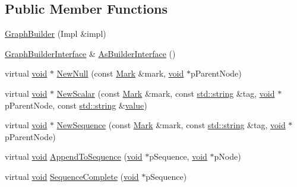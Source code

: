 \subsection*{Public Member Functions}
\begin{DoxyCompactItemize}
\item 
\mbox{\hyperlink{class_y_a_m_l_1_1_graph_builder_ae7f73588ad09321c10c09dff742bcc62}{Graph\+Builder}} (Impl \&impl)
\item 
\mbox{\hyperlink{class_y_a_m_l_1_1_graph_builder_interface}{Graph\+Builder\+Interface}} \& \mbox{\hyperlink{class_y_a_m_l_1_1_graph_builder_a11986f0addaf16cc02c637d16a039f78}{As\+Builder\+Interface}} ()
\item 
virtual \mbox{\hyperlink{glad_8h_a950fc91edb4504f62f1c577bf4727c29}{void}} $\ast$ \mbox{\hyperlink{class_y_a_m_l_1_1_graph_builder_a87d59ffe96e3101f96e0791aacba0f0b}{New\+Null}} (const \mbox{\hyperlink{struct_y_a_m_l_1_1_mark}{Mark}} \&mark, \mbox{\hyperlink{glad_8h_a950fc91edb4504f62f1c577bf4727c29}{void}} $\ast$p\+Parent\+Node)
\item 
virtual \mbox{\hyperlink{glad_8h_a950fc91edb4504f62f1c577bf4727c29}{void}} $\ast$ \mbox{\hyperlink{class_y_a_m_l_1_1_graph_builder_a8601c82a8c24fd4bb2e9e84b5f5d3316}{New\+Scalar}} (const \mbox{\hyperlink{struct_y_a_m_l_1_1_mark}{Mark}} \&mark, const \mbox{\hyperlink{glad_8h_ac83513893df92266f79a515488701770}{std\+::string}} \&tag, \mbox{\hyperlink{glad_8h_a950fc91edb4504f62f1c577bf4727c29}{void}} $\ast$p\+Parent\+Node, const \mbox{\hyperlink{glad_8h_ac83513893df92266f79a515488701770}{std\+::string}} \&\mbox{\hyperlink{glad_8h_a03aff08f73d7fde3d1a08e0abd8e84fa}{value}})
\item 
virtual \mbox{\hyperlink{glad_8h_a950fc91edb4504f62f1c577bf4727c29}{void}} $\ast$ \mbox{\hyperlink{class_y_a_m_l_1_1_graph_builder_abfe9a35d5d8c61577234fbaaf9b0c5ef}{New\+Sequence}} (const \mbox{\hyperlink{struct_y_a_m_l_1_1_mark}{Mark}} \&mark, const \mbox{\hyperlink{glad_8h_ac83513893df92266f79a515488701770}{std\+::string}} \&tag, \mbox{\hyperlink{glad_8h_a950fc91edb4504f62f1c577bf4727c29}{void}} $\ast$p\+Parent\+Node)
\item 
virtual \mbox{\hyperlink{glad_8h_a950fc91edb4504f62f1c577bf4727c29}{void}} \mbox{\hyperlink{class_y_a_m_l_1_1_graph_builder_a50e6d0e3eed6145d9f93b0761bb67b5f}{Append\+To\+Sequence}} (\mbox{\hyperlink{glad_8h_a950fc91edb4504f62f1c577bf4727c29}{void}} $\ast$p\+Sequence, \mbox{\hyperlink{glad_8h_a950fc91edb4504f62f1c577bf4727c29}{void}} $\ast$p\+Node)
\item 
virtual \mbox{\hyperlink{glad_8h_a950fc91edb4504f62f1c577bf4727c29}{void}} \mbox{\hyperlink{class_y_a_m_l_1_1_graph_builder_ae94e00378956c3d1dec2cce5cdbd70fc}{Sequence\+Complete}} (\mbox{\hyperlink{glad_8h_a950fc91edb4504f62f1c577bf4727c29}{void}} $\ast$p\+Sequence)

\end{DoxyCompactItemize}
